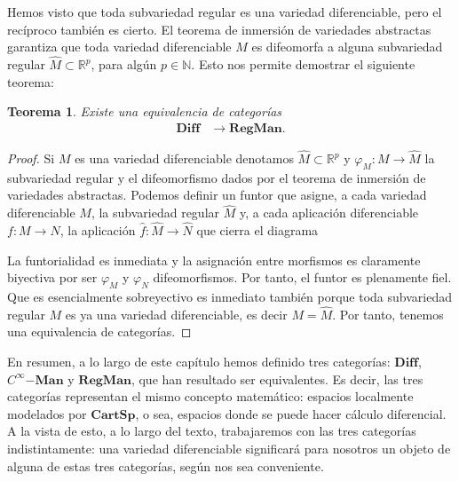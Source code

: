 \documentclass[12pt,a4paper]{book}
\newtheorem{thm}{Teorema}[section]
\theoremstyle{definition} \newtheorem{defn}[thm]{Definición}
\theoremstyle{definition} \newtheorem{ejemplo}[thm]{Ejemplo}
\theoremstyle{definition} \newtheorem{ejercicio}[thm]{Ejercicio}
\theoremstyle{remark} \newtheorem*{obs}{Observación}
\def\RR{\mathbb{R}}
\def\NN{\mathbb{N}}
\begin{document}
    Hemos visto que toda subvariedad regular es una variedad diferenciable, pero el recíproco también es cierto. El teorema de inmersión de variedades abstractas garantiza que toda variedad diferenciable $M$ es difeomorfa a alguna subvariedad regular $\hat{M} \subset \RR^p$, para algún $p\in \NN$. Esto nos permite demostrar el siguiente teorema:

    \begin{thm}
      Existe una equivalencia de categorías
      \begin{align*}
	\mathbf{Diff}&\longrightarrow \mathbf{RegMan}.
	\end{align*}
    \end{thm}
    \begin{proof}
      Si $M$ es una variedad diferenciable denotamos $\hat{M} \subset \RR^p$ y $\varphi_M:M \rightarrow \hat{M}$ la subvariedad regular y el difeomorfismo dados por el teorema de inmersión de variedades abstractas. Podemos definir un funtor que asigne, a cada variedad diferenciable $M$, la subvariedad regular $\hat{M}$ y, a cada aplicación diferenciable $f:M \rightarrow N$, la aplicación $\hat{f}:\hat{M} \rightarrow \hat{N}$ que cierra el diagrama
      \begin{center}
       \end{center}
       La funtorialidad es inmediata y la asignación entre morfismos es claramente biyectiva por ser $\varphi_M$ y $\varphi_N$ difeomorfismos. Por tanto, el funtor es plenamente fiel. Que es esencialmente sobreyectivo es inmediato también porque toda subvariedad regular $M$ es ya una variedad diferenciable, es decir $M=\hat{M}$. Por tanto, tenemos una equivalencia de categorías.
    \end{proof}

    En resumen, a lo largo de este capítulo hemos definido tres categorías: $\mathbf{Diff}$, $C^\infty\mathbf{-Man}$ y $\mathbf{RegMan}$, que han resultado ser equivalentes. Es decir, las tres categorías representan el mismo concepto matemático: espacios localmente modelados por $\mathbf{CartSp}$, o sea, espacios donde se puede hacer cálculo diferencial. A la vista de esto, a lo largo del texto, trabajaremos con las tres categorías indistintamente: una variedad diferenciable significará para nosotros un objeto de alguna de estas tres categorías, según nos sea conveniente.
\end{document}
